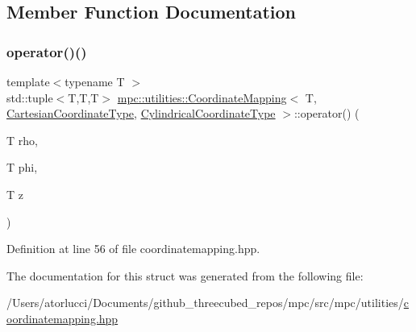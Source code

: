 \subsection{Member Function Documentation}
\mbox{\label{structmpc_1_1utilities_1_1_coordinate_mapping_3_01_t_00_01_cartesian_coordinate_type_00_01_cylindrical_coordinate_type_01_4_a72140571d694e8eb77e72509ce827c92}} 
\subsubsection{\texorpdfstring{operator()()}{operator()()}}
{\footnotesize\ttfamily template$<$typename T $>$ \\
std\+::tuple$<$T,T,T$>$ \mbox{\hyperlink{structmpc_1_1utilities_1_1_coordinate_mapping}{mpc\+::utilities\+::\+Coordinate\+Mapping}}$<$ T, \mbox{\hyperlink{structmpc_1_1utilities_1_1_cartesian_coordinate_type}{Cartesian\+Coordinate\+Type}}, \mbox{\hyperlink{structmpc_1_1utilities_1_1_cylindrical_coordinate_type}{Cylindrical\+Coordinate\+Type}} $>$\+::operator() (\begin{DoxyParamCaption}\item[{T}]{rho,  }\item[{T}]{phi,  }\item[{T}]{z }\end{DoxyParamCaption})\hspace{0.3cm}{\ttfamily [inline]}}



Definition at line 56 of file coordinatemapping.\+hpp.



The documentation for this struct was generated from the following file\+:\begin{DoxyCompactItemize}
\item 
/\+Users/atorlucci/\+Documents/github\+\_\+threecubed\+\_\+repos/mpc/src/mpc/utilities/\mbox{\hyperlink{coordinatemapping_8hpp}{coordinatemapping.\+hpp}}\end{DoxyCompactItemize}
